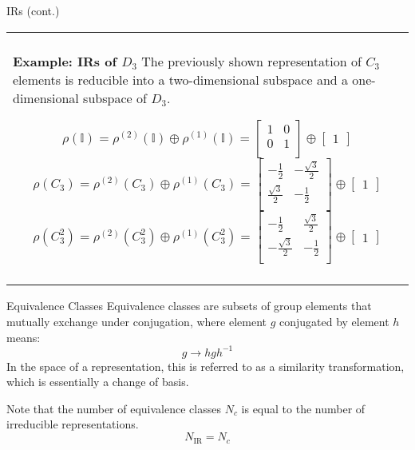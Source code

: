 \documentclass[11pt]{beamer}
\newenvironment{boxed2}
    {\begin{center}
    \begin{tabular}{|p{0.95\textwidth}|}
    \hline\\
    }
    { 
    \\\\\hline
    \end{tabular} 
    \end{center}
    }
\begin{document}
\begin{frame}{IRs (cont.)}

\begin{boxed2}
	
	\vspace{-.57cm}
	
	\textbf{Example: IRs of $D_3$} The previously shown representation of $C_3$ elements is reducible into a two-dimensional subspace and a one-dimensional subspace of $D_3$. 
	
	\vspace{-.12cm}

$$
\rho(\mathbb{I}) =
\rho^{(2)}(\mathbb{I})\oplus\rho^{(1)}(\mathbb{I})
=
\begin{bmatrix}
1&0\\
0&1\\
\end{bmatrix}
\oplus 
\begin{bmatrix}
1
\end{bmatrix}
$$
$$
\rho(C_3)
=\rho^{(2)}(C_3)\oplus\rho^{(1)}(C_3)=
\begin{bmatrix}
	-\frac{1}{2}&-\frac{\sqrt{3}}{2}\\
	\frac{\sqrt{3}}{2}&-\frac{1}{2}\\
\end{bmatrix}
\oplus
\begin{bmatrix}
	1
\end{bmatrix}
$$
$$
\rho(C_3^2) 
=
\rho^{(2)}(C_3^2)\oplus\rho^{(1)}(C_3^2)
= 
\begin{bmatrix}
	-\frac{1}{2}&\frac{\sqrt{3}}{2}\\
	-\frac{\sqrt{3}}{2}&-\frac{1}{2}\\
\end{bmatrix}
\oplus
\begin{bmatrix}
	1
\end{bmatrix}
$$
	
	\vspace{-.3cm}
	
\end{boxed2}
\end{frame}

\begin{frame}{Equivalence Classes}
Equivalence classes are subsets of group elements that mutually exchange under conjugation, where element $g$ conjugated by element $h$ means:
$$
g\rightarrow hgh^{-1}
$$
In the space of a representation, this is referred to as a similarity transformation, which is essentially a change of basis.

\medskip

Note that the number of equivalence classes $N_c$ is equal to the number of irreducible representations.
$$
N_{\text{IR}} = N_{c}
$$
\end{frame}
\end{document}
